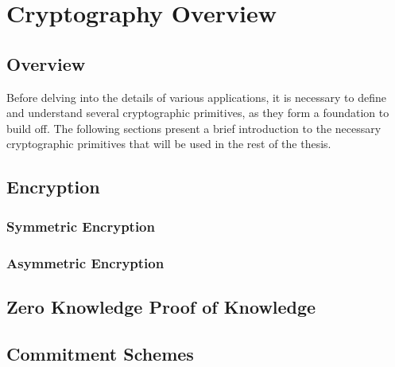 \chapter{Cryptography Overview}
\label{chapter:cryptographyoverview}

\section{Overview}
Before delving into the details of various applications, it is necessary to define and understand several
cryptographic primitives, as they form a foundation to build off. The following sections present a brief
introduction to the necessary cryptographic primitives that will be used in the rest of the thesis.

\section{Encryption}

\subsection{Symmetric Encryption}

\subsection{Asymmetric Encryption}

\section{Zero Knowledge Proof of Knowledge}

\section{Commitment Schemes}
